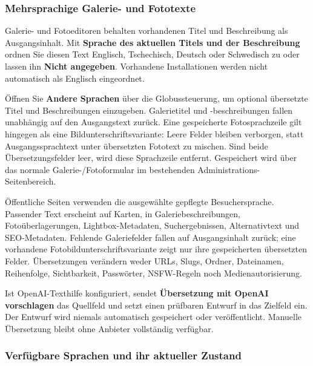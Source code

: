 \documentclass[11pt,a4paper]{article}
\newcommand{\ui}[1]{\textbf{#1}}
\begin{document}
\subsubsection{Mehrsprachige Galerie- und Fototexte}

Galerie- und Fotoeditoren behalten vorhandenen Titel und Beschreibung als
Ausgangsinhalt. Mit \ui{Sprache des aktuellen Titels und der Beschreibung}
ordnen Sie diesen Text Englisch, Tschechisch, Deutsch oder Schwedisch zu oder
lassen ihn \ui{Nicht angegeben}. Vorhandene Installationen werden nicht
automatisch als Englisch eingeordnet.

Öffnen Sie \ui{Andere Sprachen} über die Globussteuerung, um optional übersetzte
Titel und Beschreibungen einzugeben. Galerietitel und -beschreibungen fallen
unabhängig auf den Ausgangstext zurück. Eine gespeicherte Fotosprachzeile gilt
hingegen als eine Bildunterschriftsvariante: Leere Felder bleiben verborgen,
statt Ausgangssprachtext unter übersetzten Fototext zu mischen. Sind beide
Übersetzungsfelder leer, wird diese Sprachzeile entfernt. Gespeichert wird über
das normale Galerie-/Fotoformular im bestehenden Administrations-Seitenbereich.

Öffentliche Seiten verwenden die ausgewählte gepflegte Besuchersprache.
Passender Text erscheint auf Karten, in Galeriebeschreibungen,
Fotoüberlagerungen, Lightbox-Metadaten, Suchergebnissen, Alternativtext und
SEO-Metadaten. Fehlende Galeriefelder fallen auf Ausgangsinhalt zurück; eine
vorhandene Fotobildunterschriftsvariante zeigt nur ihre gespeicherten
übersetzten Felder. Übersetzungen verändern weder URLs, Slugs, Ordner,
Dateinamen, Reihenfolge, Sichtbarkeit, Passwörter, NSFW-Regeln noch
Medienautorisierung.

Ist OpenAI-Texthilfe konfiguriert, sendet \ui{Übersetzung mit OpenAI
vorschlagen} das Quellfeld und setzt einen prüfbaren Entwurf in das Zielfeld
ein. Der Entwurf wird niemals automatisch gespeichert oder veröffentlicht.
Manuelle Übersetzung bleibt ohne Anbieter vollständig verfügbar.

\subsubsection{Verfügbare Sprachen und ihr aktueller Zustand}
\end{document}
